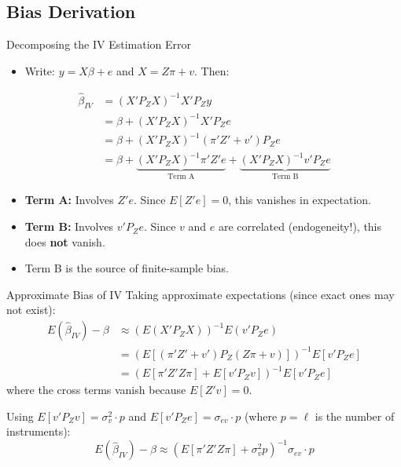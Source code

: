 \documentclass[aspectratio=169, handout]{beamer}
\numberwithin{equation}{section}
\begin{document}
\subsection{Bias Derivation}

\begin{frame}{Decomposing the IV Estimation Error}
\begin{itemize}
\item Write: $y=X\beta+e$ and $X=Z\pi+v$.  Then:
\end{itemize}
\begin{align*}
\hat{\beta}_{IV}&=(X'P_ZX)^{-1}X'P_Zy\\
&=\beta+(X'P_ZX)^{-1}X'P_Ze\\
&=\beta+(X'P_ZX)^{-1}(\pi'Z'+v')P_Ze\\
&=\beta+\underbrace{(X'P_ZX)^{-1}\pi'Z'e}_{\text{Term A}}+\underbrace{(X'P_ZX)^{-1}v'P_Ze}_{\text{Term B}}
\end{align*}
\begin{itemize}
\item \textbf{Term A:} Involves $Z'e$.  Since $E[Z'e]=0$, this vanishes in expectation.
\item \textbf{Term B:} Involves $v'P_Ze$.  Since $v$ and $e$ are correlated (endogeneity!), this does \textbf{not} vanish.
\item Term B is the source of finite-sample bias.
\end{itemize}
\end{frame}


\begin{frame}{Approximate Bias of IV}
Taking approximate expectations (since exact ones may not exist):
\begin{align*}
E(\hat{\beta}_{IV})-\beta&\approx (E(X'P_ZX))^{-1}E(v'P_Ze)\\
&=(E[(\pi'Z'+v')P_Z(Z\pi+v)])^{-1}E[v'P_Ze]\\
&=(E[\pi'Z'Z\pi]+E[v'P_Zv])^{-1}E[v'P_Ze]
\end{align*}
where the cross terms vanish because $E[Z'v]=0$.

Using $E[v'P_Zv]=\sigma_v^2\cdot p$ and $E[v'P_Ze]=\sigma_{ev}\cdot p$ (where $p=\ell$ is the number of instruments):
$$E(\hat{\beta}_{IV})-\beta\approx (E[\pi'Z'Z\pi]+\sigma_v^2 p)^{-1}\sigma_{ev}\cdot p$$
\end{frame}
\end{document}

